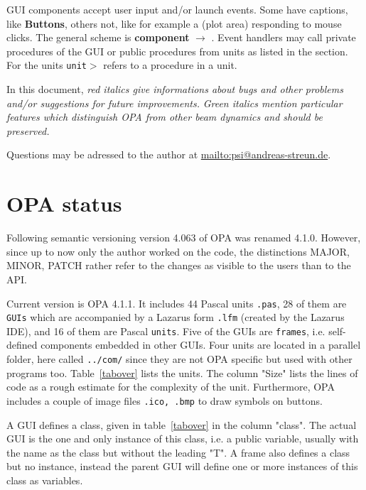 \documentclass[12pt]{article}
\newcommand\code[1]{{\tt #1}}
\newcommand{\ofld}[1]{\colorbox{black!15}{{\bf #1}}}
\newcommand{\ofldx}[1]{\colorbox{black!15}{(#1)}}
\newcommand\guico[1]{{\color{blue}\code{#1}}}
\newcommand{\unico}[1]{{\color{burntorange}\code{#1}}}
\newcommand{\evcod}[2]{\ofld{#1} $\rightarrow$ \guico{#2}}
\newcommand{\prcod}[2]{\opauni{#1}$>$\unico{#2}}
\newcommand{\opagui}[1]{\colorbox{blue!20}{\code{#1}}}
\newcommand{\opaguif}[1]{\colorbox{violet!30}{\code{#1}}}
\newcommand{\opauni}[1]{\colorbox{orange!30}{\code{#1}}}
\newcommand{\todo}[1]{{\color{red}\em #1}}
\newcommand{\feature}[1]{{\color{cadmiumgreen}\em #1}}
\begin{document}
GUI components accept user input and/or launch events. Some have captions, like \ofld{Buttons}, others not, like for example a \ofldx{plot area} responding to mouse clicks. The general scheme is \evcod{component}{event handler}. Event handlers may call private procedures of the GUI or public procedures from units as listed in the \guico{uses} section. For the units \prcod{unit}{procedure} refers to a procedure in a unit.

In this document, \todo{red italics give informations about bugs and other problems and/or suggestions for future improvements.} \feature{Green italics mention particular features which distinguish OPA from other beam dynamics and should be preserved.}

Questions may be adressed to the author at \url{mailto:psi@andreas-streun.de}.

\newpage


\section{OPA status}

Following semantic versioning \cite{semver} version 4.063 of OPA was renamed 4.1.0. However, since up to now only the author worked on the code, the distinctions MAJOR, MINOR, PATCH rather refer to the changes as visible to the users than to the API. 


Current version is OPA 4.1.1. It includes 44 Pascal units \code{.pas}, 28 of them are \opagui{GUIs} which are accompanied by a Lazarus form \code{.lfm} (created by the Lazarus IDE), and 16 of them are Pascal \opauni{units}. Five of the GUIs are \opaguif{frames}, i.e. self-defined components embedded in other GUIs. Four units are located in a parallel folder, here called \code{../com/} since they are not OPA specific but used with other programs too.
Table~\ref{tabover} lists the units. The column "Size" lists the lines of code as a rough estimate for the complexity of the unit. Furthermore, OPA includes a couple of image files \code{.ico, .bmp} to draw symbols on buttons. 

A GUI defines a class, given in table~\ref{tabover} in the column "class". The actual GUI is the one and only instance of this class, i.e. a public variable, usually with the name as the class but without the leading "T". A frame also defines a class but no instance, instead the parent GUI will define one or more instances of this class as variables.
\end{document}
